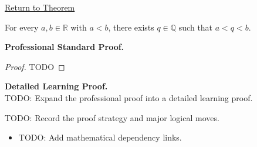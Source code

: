 \newpage
{}
\label{prf:density-of-rationals-in-reals}

\begin{remark*}[Return]
\hyperref[thm:density-of-rationals-in-reals]{Return to Theorem}
\end{remark*}

\begin{theorem*}
For every $a,b\in\mathbb{R}$ with $a<b$, there exists $q\in\mathbb{Q}$ such that $a<q<b$.
\end{theorem*}

\textbf{Professional Standard Proof.}~\\
\begin{proof}
TODO
\end{proof}

\textbf{Detailed Learning Proof.}~\\
TODO: Expand the professional proof into a detailed learning proof.

\begin{remark*}
TODO: Record the proof strategy and major logical moves.
\end{remark*}

\begin{dependencies}
\begin{itemize}
  \item TODO: Add mathematical dependency links.
\end{itemize}
\end{dependencies}
